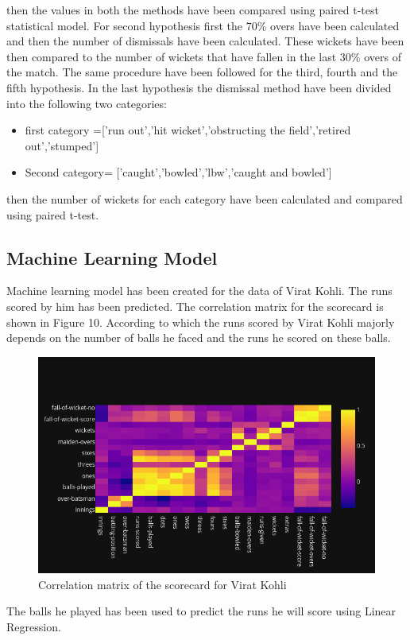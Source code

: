 \documentclass[fleqn,10pt]{wlscirep}
\begin{document}
then the values in both the methods have been compared using paired t-test statistical model.\newline
For second hypothesis first the 70\% overs have been calculated and then the number of dismissals have been calculated.
These wickets have been then compared to the number of wickets that have fallen in the last 30\% overs of the match.\newline
The same procedure have been followed for the third, fourth and the fifth hypothesis.\newline
In the last hypothesis the dismissal method have been divided into the following two categories:
    \begin{itemize}
        \item first category =['run out','hit wicket','obstructing the field','retired out','stumped']
        \item Second category= ['caught','bowled','lbw','caught and bowled']
    \end{itemize}
then the number of wickets for each category have been calculated and compared using paired t-test. 
\subsection{Machine Learning Model}
Machine learning model has been created for the data of Virat Kohli. The runs scored by him has been predicted.
The correlation matrix for the scorecard is shown in Figure 10. According to which the runs scored by Virat Kohli
majorly depends on the number of balls he faced and the runs he scored on these balls.
\begin{figure}[h!]
    \centering
    \includegraphics[width=1\textwidth]{correlation.png}
    \caption{Correlation matrix of the scorecard for Virat Kohli}
  \end{figure}
The balls he played has been used to predict the runs he will score using Linear Regression.
\end{document}
